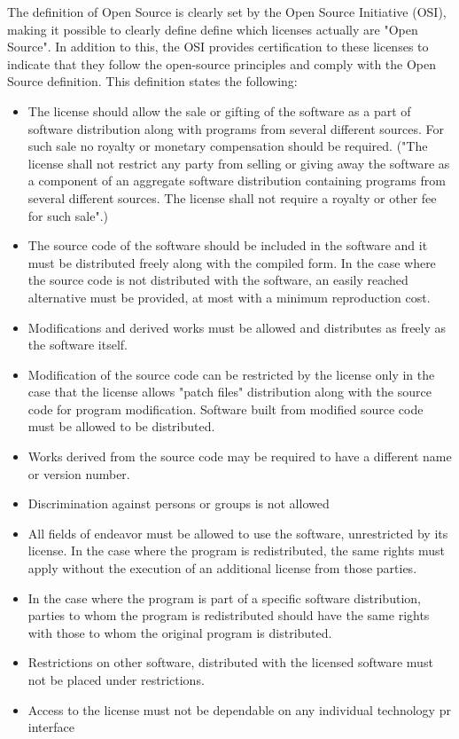 The definition of Open Source is clearly set by the Open Source Initiative (OSI), making it possible to clearly define define which licenses actually are "Open Source". In addition to this, the OSI provides certification to these licenses to indicate that they follow the open-source principles and comply with the Open Source definition. This definition states the following:
\begin{itemize}

\item The license should allow the sale or gifting of the software as a part of software distribution along with programs from several different sources. For such sale no royalty or monetary compensation should be required. ("The license shall not restrict any party from selling or giving away the software as a component of an aggregate software distribution containing programs from several different sources. The license shall not require a royalty or other fee for such sale".)
\item The source code of the software should be included in the software and it must be distributed freely along with the compiled form. In the case where the source code is not distributed with the software, an easily reached alternative must be provided, at most with a minimum reproduction cost.
\item Modifications and derived works must be allowed and distributes as freely as the software itself.
\item Modification of the source code can be restricted by the license only in the case that the license allows "patch files" distribution along with the source code for program modification. Software built from modified source code must be allowed to be distributed. \item Works derived from the source code may be required to have a different name or version number.
\item Discrimination against persons or groups is not allowed
\item All fields of endeavor must be allowed to use the software, unrestricted by its license.
In the case where the program is redistributed, the same rights must apply without the execution of an additional license from those parties.
\item In the case where the program is part of a specific software distribution, parties to whom the program is redistributed should have the same rights with those to  whom the original program is distributed.
\item Restrictions on other software, distributed with the licensed software must not be placed under restrictions.
\item Access to the license must not be dependable on any individual technology pr interface
\end{itemize}

